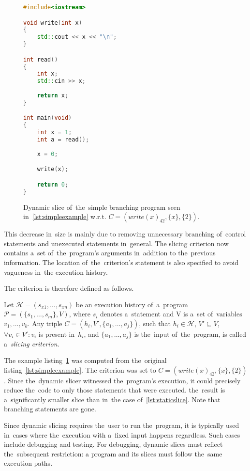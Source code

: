 \begin{figure}[ht]\centering
\begin{lstlisting}[language=C++]
#include<iostream>

void write(int x)
{
	std::cout << x << "\n";
}

int read()
{
	int x;
	std::cin >> x;
	
	return x;
}

int main(void)
{
	int x = 1;
	int a = read();
		
	x = 0;

	write(x);

	return 0;
}  
\end{lstlisting}
\caption{Dynamic slice of~the~simple branching program seen
in~\ref{lst:simpleexample} w.r.t. $C = (write(x)_{42}, \{x\}, \{2\})$.}
\label{lst:dynamicslice}
\end{figure}

This decrease in~size is mainly due to removing unnecessary 
branching of~control statements and unexecuted statements in~general. 
The slicing criterion now contains a~set of~the~program's 
arguments in~addition to the~previous information. 
The location of~the~criterion's statement is also specified to avoid 
vagueness in~the execution history. 

The criterion is therefore defined as follows.

\begin{defn}\label{def02:6}
  Let $\mathcal{H} = (s_{x1},\dots,s_{xn})$ be an execution history of~a~program 
  $\mathcal{P} = (\{s_1,\dots,s_m\}, V)$, where $s_i$ denotes a~statement
  and V is a~set of~variables $v_1,\dots,v_k$.
  Any triple $C = (h_i, V', \{a_1,\dots,a_j\})$, such that $h_i \in \mathcal{H}$,
  $V' \subseteq V$, $\forall v_i \in V': v_i$ is present in~$h_i$,
  and $\{a_1,\dots,a_j\}$ is the~input of~the~program,
  is called a~\emph{slicing criterion}.
\end{defn}

The example listing~\ref{lst:dynamicslice} was computed from the~original
listing~\ref{lst:simpleexample}. 
The criterion was set to $C = (write(x)_{42}, \{x\}, \{2\})$.
Since the~dynamic slicer witnessed the~program's execution,
it could precisely reduce the~code to only those statements
that were executed. the~result is a~significantly smaller slice
than in~the case of~\ref{lst:staticslice}.
Note that branching statements are gone.

Since dynamic slicing requires the~user to run the~program, 
it is typically used in~cases where the~execution with a~fixed 
input happens regardless. Such cases include debugging and testing. 
For debugging, dynamic slices must reflect the~subsequent restriction: 
a program and its slices must follow the~same execution paths.

